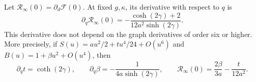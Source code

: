 \begin{proposition}
\label{prop:v4-quartic}
Let $\mathcal R_\infty(0)=\partial_d\mathcal F(0)$. At fixed
$g,\kappa$, its derivative with respect to $q$ is
\begin{equation}\label{eq:v4-quartic-derivative}
 \partial_q\mathcal R_\infty(0)
       =-\frac{\cosh(2\gamma)+2}{12a^2\sinh(2\gamma)}.
\end{equation}
This derivative does not depend on the graph derivatives of order six
or higher. More precisely, if $S(u)=au^2/2+tu^4/24+O(u^6)$ and
$B(u)=1+\beta u^2+O(u^4)$, then
\begin{equation}\label{eq:v4-quartic-parts}
 \partial_qt=\coth(2\gamma),\qquad
 \partial_q\beta=-\frac1{4a\sinh(2\gamma)},\qquad
 \mathcal R_\infty(0)=\frac{2\beta}{3a}-\frac{t}{12a^2}.
\end{equation}
\end{proposition}
